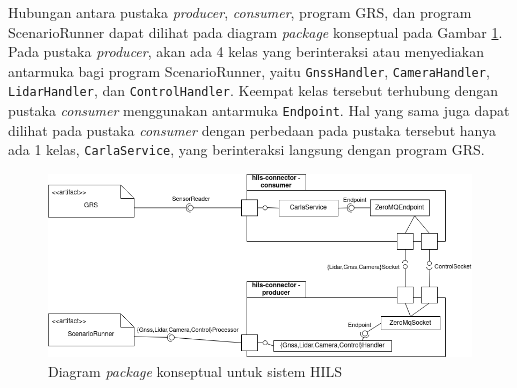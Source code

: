 Hubungan antara pustaka \textit{producer}, \textit{consumer}, program GRS, dan
program ScenarioRunner dapat dilihat pada diagram \textit{package} konseptual
pada Gambar \ref{chapter-4-conseptual-package-diagram}. Pada pustaka
\textit{producer}, akan ada 4 kelas yang berinteraksi atau menyediakan antarmuka
bagi program ScenarioRunner, yaitu \texttt{GnssHandler}, \texttt{CameraHandler},
\texttt{LidarHandler}, dan \texttt{ControlHandler}. Keempat kelas tersebut
terhubung dengan pustaka \textit{consumer} menggunakan antarmuka
\texttt{Endpoint}. Hal yang sama juga dapat dilihat pada pustaka
\textit{consumer} dengan perbedaan pada pustaka tersebut hanya ada 1 kelas,
\texttt{CarlaService}, yang berinteraksi langsung dengan program GRS.
\begin{figure}[!htbp]
	\centering
	\includegraphics[width=1.0\textwidth]{resources/chapter-4/conceptual-package-diagram.png}
	\caption{Diagram \textit{package} konseptual untuk sistem HILS}
	\label{chapter-4-conseptual-package-diagram}
\end{figure}

